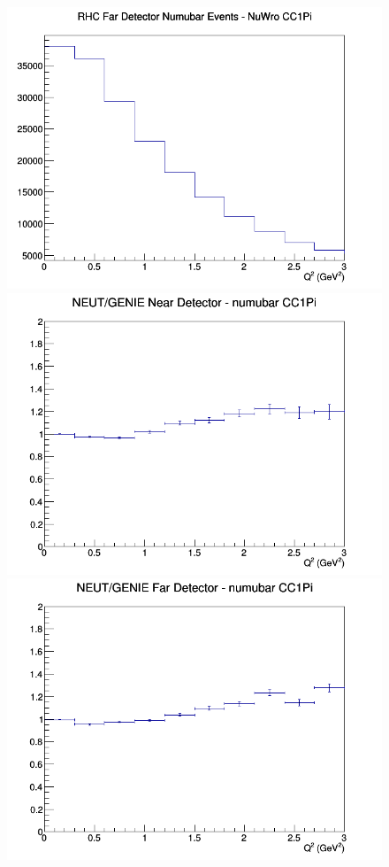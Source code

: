 \begin{figure}[h]
\endminipage
{}
\includegraphics[width=\linewidth]{Q2/nominal/CC1Pi_RHC_FD_numubar_Q2_NuWro.png}
\endminipage
\newline
{}
\includegraphics[width=\linewidth]{Q2/nominal/ratios/CC1Pi_NEUT_GENIE_numubar_near_Q2.png}
\endminipage
{}
\includegraphics[width=\linewidth]{Q2/nominal/ratios/CC1Pi_NEUT_GENIE_numubar_far_Q2.png}

\end{figure}
